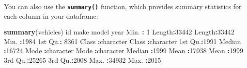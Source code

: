 \documentclass[
]{book}
\newenvironment{Shaded}{\begin{snugshade}}{\end{snugshade}}
\newcommand{\DecValTok}[1]{\textcolor[rgb]{0.00,0.00,0.81}{#1}}
\newcommand{\KeywordTok}[1]{\textcolor[rgb]{0.13,0.29,0.53}{\textbf{#1}}}
\newcommand{\NormalTok}[1]{#1}
\newcommand{\OperatorTok}[1]{\textcolor[rgb]{0.81,0.36,0.00}{\textbf{#1}}}
\newcommand{\StringTok}[1]{\textcolor[rgb]{0.31,0.60,0.02}{#1}}
\begin{document}
You can also use the \textbf{\texttt{summary()}} function, which provides summary statistics for each column in your dataframe:

\begin{Shaded}
\begin{Highlighting}[]
\KeywordTok{summary}\NormalTok{(vehicles)}
\NormalTok{       id            make              model                year     }
\NormalTok{ Min.   }\OperatorTok{:}\StringTok{    }\DecValTok{1}\NormalTok{   Length}\OperatorTok{:}\DecValTok{33442}\NormalTok{       Length}\OperatorTok{:}\DecValTok{33442}\NormalTok{       Min.   }\OperatorTok{:}\DecValTok{1984}  
\NormalTok{ 1st Qu.}\OperatorTok{:}\StringTok{ }\DecValTok{8361}\NormalTok{   Class }\OperatorTok{:}\NormalTok{character   Class }\OperatorTok{:}\NormalTok{character   1st Qu.}\OperatorTok{:}\DecValTok{1991}  
\NormalTok{ Median }\OperatorTok{:}\DecValTok{16724}\NormalTok{   Mode  }\OperatorTok{:}\NormalTok{character   Mode  }\OperatorTok{:}\NormalTok{character   Median }\OperatorTok{:}\DecValTok{1999}  
\NormalTok{ Mean   }\OperatorTok{:}\DecValTok{17038}\NormalTok{                                         Mean   }\OperatorTok{:}\DecValTok{1999}  
\NormalTok{ 3rd Qu.}\OperatorTok{:}\DecValTok{25265}\NormalTok{                                         3rd Qu.}\OperatorTok{:}\DecValTok{2008}  
\NormalTok{ Max.   }\OperatorTok{:}\DecValTok{34932}\NormalTok{                                         Max.   }\OperatorTok{:}\DecValTok{2015}  
                                                                     

\end{Highlighting}
\end{Shaded}
\end{document}
